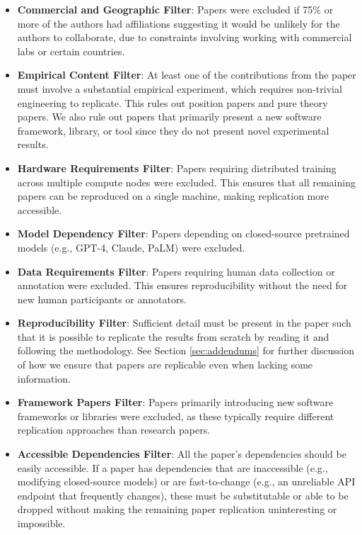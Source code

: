 \documentclass{article}
\theoremstyle{plain}
\theoremstyle{definition}
\theoremstyle{remark}
\begin{document}
\begin{itemize}
    \item \textbf{Commercial and Geographic Filter}: Papers were excluded if 75\% or more of the authors had affiliations suggesting it would be unlikely for the authors to collaborate, due to constraints involving working with commercial labs or certain countries.
    \item \textbf{Empirical Content Filter}: At least one of the contributions from the paper must involve a substantial empirical experiment, which requires non-trivial engineering to replicate. This rules out position papers and pure theory papers. We also rule out papers that primarily present a new software framework, library, or tool since they do not present novel experimental results.
    \item \textbf{Hardware Requirements Filter}: Papers requiring distributed training across multiple compute nodes were excluded. This ensures that all remaining papers can be reproduced on a single machine, making replication more accessible.
    \item \textbf{Model Dependency Filter}: Papers depending on closed-source pretrained models (e.g., GPT-4, Claude, PaLM) were excluded.
    \item \textbf{Data Requirements Filter}: Papers requiring human data collection or annotation were excluded. This ensures reproducibility without the need for new human participants or annotators.
    \item \textbf{Reproducibility Filter}: Sufficient detail must be present in the paper such that it is possible to replicate the results from scratch by reading it and following the methodology. See Section \ref{sec:addendums} for further discussion of how we ensure that papers are replicable even when lacking some information.
    \item \textbf{Framework Papers Filter}: Papers primarily introducing new software frameworks or libraries were excluded, as these typically require different replication approaches than research papers.
    \item \textbf{Accessible Dependencies Filter}: All the paper’s dependencies should be easily accessible. If a paper has dependencies that are inaccessible (e.g., modifying closed-source models) or are fast-to-change (e.g., an unreliable API endpoint that frequently changes), these must be substitutable or able to be dropped without making the remaining paper replication uninteresting or impossible.
\end{itemize}
\end{document}
